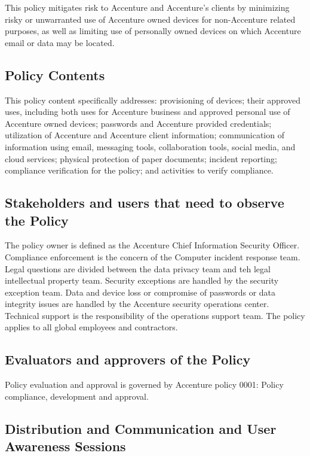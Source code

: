 \documentclass[stu]{apa7}
\begin{document}
This policy mitigates risk to Accenture and Accenture's clients by minimizing risky or unwarranted use of Accenture owned devices for non-Accenture related purposes, as well as limiting use of personally owned devices on which Accenture email or data may be located.

\subsection{Policy Contents}
\label{sec:org32781e9}

This policy content specifically addresses: provisioning of devices; their approved uses, including both uses for Accenture business and approved personal use of Accenture owned devices; passwords and Accenture provided credentials; utilization of Accenture and Accenture client information; communication of information using email, messaging tools, collaboration tools, social media, and cloud services; physical protection of paper documents; incident reporting; compliance verification for the policy; and activities to verify compliance.

\subsection{Stakeholders and users that need to observe the Policy}
\label{sec:orgf58ab20}

The policy owner is defined as the Accenture Chief Information Security Officer. Compliance enforcement is the concern of the Computer incident response team. Legal questions are divided between the data privacy team and teh legal intellectual property team. Security exceptions are handled by the security exception team. Data and device loss or compromise of passwords or data integrity issues are handled by the Accenture security operations center. Technical support is the responsibility of the operations support team. The policy applies to all global employees and contractors.

\subsection{Evaluators and approvers of the Policy}
\label{sec:orgc835756}

Policy evaluation and approval is governed by Accenture policy 0001: Policy compliance, development and approval.

\subsection{Distribution and Communication and User Awareness Sessions}
\label{sec:orga46ab21}
\end{document}
